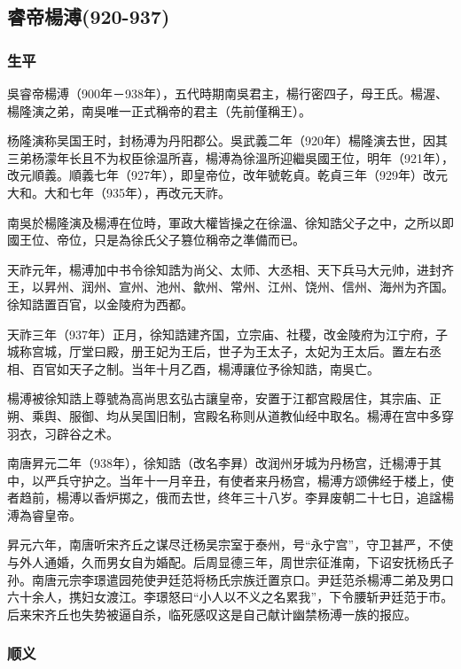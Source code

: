 
\subsection{睿帝楊溥\tiny(920-937)}

\subsubsection{生平}

吳睿帝楊溥（900年－938年），五代時期南吳君主，楊行密四子，母王氏。楊渥、楊隆演之弟，南吳唯一正式稱帝的君主（先前僅稱王）。

杨隆演称吴国王时，封杨溥为丹阳郡公。吳武義二年（920年）楊隆演去世，因其三弟杨濛年长且不为权臣徐温所喜，楊溥為徐溫所迎繼吳國王位，明年（921年），改元順義。順義七年（927年），即皇帝位，改年號乾貞。乾貞三年（929年）改元大和。大和七年（935年），再改元天祚。

南吳於楊隆演及楊溥在位時，軍政大權皆操之在徐溫、徐知誥父子之中，之所以即國王位、帝位，只是為徐氏父子篡位稱帝之準備而已。

天祚元年，楊溥加中书令徐知誥为尚父、太师、大丞相、天下兵马大元帅，进封齐王，以昇州、润州、宣州、池州、歙州、常州、江州、饶州、信州、海州为齐国。徐知誥置百官，以金陵府为西都。

天祚三年（937年）正月，徐知誥建齐国，立宗庙、社稷，改金陵府为江宁府，子城称宫城，厅堂曰殿，册王妃为王后，世子为王太子，太妃为王太后。置左右丞相、百官如天子之制。当年十月乙酉，楊溥讓位予徐知誥，南吳亡。

楊溥被徐知誥上尊號為高尚思玄弘古讓皇帝，安置于江都宫殿居住，其宗庙、正朔、乘舆、服御、均从吴国旧制，宫殿名称则从道教仙经中取名。楊溥在宫中多穿羽衣，习辟谷之术。

南唐昇元二年（938年），徐知誥（改名李昪）改润州牙城为丹杨宫，迁楊溥于其中，以严兵守护之。当年十一月辛丑，有使者来丹杨宫，楊溥方颂佛经于楼上，使者趋前，楊溥以香炉掷之，俄而去世，终年三十八岁。李昪废朝二十七日，追諡楊溥為睿皇帝。

昇元六年，南唐听宋齐丘之谋尽迁杨吴宗室于泰州，号“永宁宫”，守卫甚严，不使与外人通婚，久而男女自为婚配。后周显德三年，周世宗征淮南，下诏安抚杨氏子孙。南唐元宗李璟遣园苑使尹廷范将杨氏宗族迁置京口。尹廷范杀楊溥二弟及男口六十余人，携妇女渡江。李璟怒曰“小人以不义之名累我”，下令腰斩尹廷范于市。后来宋齐丘也失势被逼自杀，临死感叹这是自己献计幽禁杨溥一族的报应。


\subsubsection{顺义}

